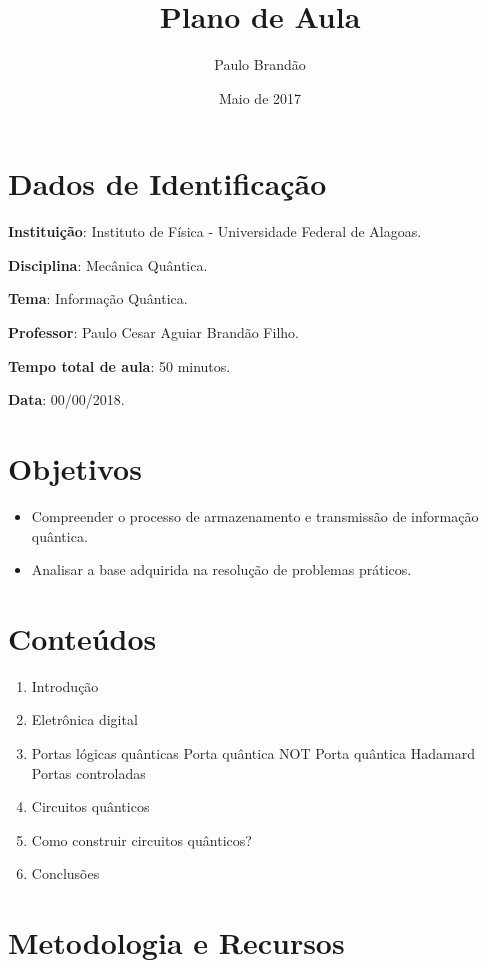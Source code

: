 \documentclass{article}
\title{\Huge\color{astral}\textbf{Plano de Aula}}
\author{Paulo Brandão}
\date{Maio de 2017}
\begin{document}
\maketitle

\section{Dados de Identificação}

\noindent \textbf{Instituição}: Instituto de Física - Universidade Federal de Alagoas.

\noindent \textbf{Disciplina}: Mecânica Quântica.

\noindent \textbf{Tema}: Informação Quântica.

\noindent \textbf{Professor}: Paulo Cesar Aguiar Brandão Filho.

\noindent \textbf{Tempo total de aula}: 50 minutos.

\noindent \textbf{Data}: 00/00/2018.

\section{Objetivos}

\begin{itemize}
    \item Compreender o processo de armazenamento e transmissão de informação quântica.
    \item Analisar a base adquirida na resolução de problemas práticos.
\end{itemize}

\section{Conteúdos}

\begin{enumerate}
    \item Introdução
    \item Eletrônica digital
    \item Portas lógicas quânticas
        \subitem Porta quântica NOT
        \subitem Porta quântica Hadamard
        \subitem Portas controladas
    \item Circuitos quânticos
    \item Como construir circuitos quânticos?
    \item Conclusões
\end{enumerate}

\section{Metodologia e Recursos}
\end{document}
